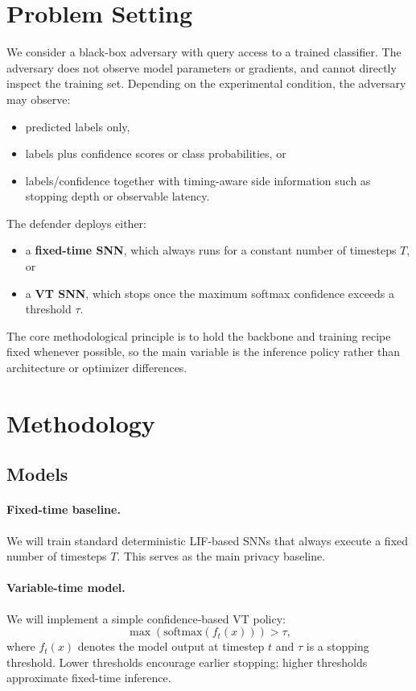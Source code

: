 \documentclass[11pt]{article}
\begin{document}
\section{Problem Setting}
We consider a black-box adversary with query access to a trained classifier. The adversary does not observe model parameters or gradients, and cannot directly inspect the training set. Depending on the experimental condition, the adversary may observe:
\begin{itemize}[leftmargin=1.3em]
\item predicted labels only,
\item labels plus confidence scores or class probabilities, or
\item labels/confidence together with timing-aware side information such as stopping depth or observable latency.
\end{itemize}

The defender deploys either:
\begin{itemize}[leftmargin=1.3em]
\item a \textbf{fixed-time SNN}, which always runs for a constant number of timesteps $T$, or
\item a \textbf{VT SNN}, which stops once the maximum softmax confidence exceeds a threshold $\tau$.
\end{itemize}

The core methodological principle is to hold the backbone and training recipe fixed whenever possible, so the main variable is the inference policy rather than architecture or optimizer differences.

\section{Methodology}
\subsection{Models}
\paragraph{Fixed-time baseline.}
We will train standard deterministic LIF-based SNNs that always execute a fixed number of timesteps $T$. This serves as the main privacy baseline.

\paragraph{Variable-time model.}
We will implement a simple confidence-based VT policy:
\[
\max(\text{softmax}(f_t(x))) > \tau,
\]
where $f_t(x)$ denotes the model output at timestep $t$ and $\tau$ is a stopping threshold. Lower thresholds encourage earlier stopping; higher thresholds approximate fixed-time inference.
\end{document}
